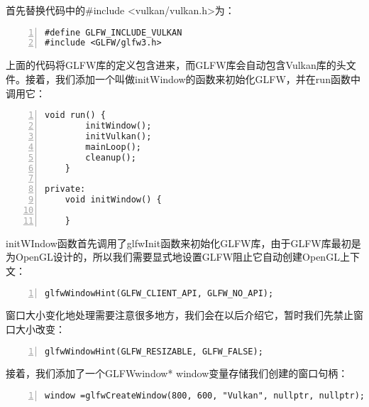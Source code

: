 \documentclass{ctexart}
\begin{document}
首先替换代码中的\#include <vulkan/vulkan.h>为：

\begin{lstlisting}[language={[ANSI]C},keywordstyle=\color{blue!70},commentstyle=\color{red!50!green!50!blue!50},frame=shadowbox, rulesepcolor=\color{red!20!green!20!blue!20},basicstyle=\small,numbers=left, numberstyle=\tiny,breaklines=true]
#define GLFW_INCLUDE_VULKAN
#include <GLFW/glfw3.h>
\end{lstlisting}

上面的代码将GLFW库的定义包含进来，而GLFW库会自动包含Vulkan库的头文件。接着，我们添加一个叫做initWindow的函数来初始化GLFW，并在run函数中调用它：

\begin{lstlisting}[language={[ANSI]C},keywordstyle=\color{blue!70},commentstyle=\color{red!50!green!50!blue!50},frame=shadowbox, rulesepcolor=\color{red!20!green!20!blue!20},basicstyle=\small,numbers=left, numberstyle=\tiny,breaklines=true]
	void run() {
		initWindow();
		initVulkan();
		mainLoop();
		cleanup();
	}

private:
	void initWindow() {

	}
\end{lstlisting}

initWIndow函数首先调用了glfwInit函数来初始化GLFW库，由于GLFW库最初是为OpenGL设计的，所以我们需要显式地设置GLFW阻止它自动创建OpenGL上下文：

\begin{lstlisting}[language={[ANSI]C},keywordstyle=\color{blue!70},commentstyle=\color{red!50!green!50!blue!50},frame=shadowbox, rulesepcolor=\color{red!20!green!20!blue!20},basicstyle=\small,numbers=left, numberstyle=\tiny,breaklines=true]
glfwWindowHint(GLFW_CLIENT_API, GLFW_NO_API);
\end{lstlisting}

窗口大小变化地处理需要注意很多地方，我们会在以后介绍它，暂时我们先禁止窗口大小改变：

\begin{lstlisting}[language={[ANSI]C},keywordstyle=\color{blue!70},commentstyle=\color{red!50!green!50!blue!50},frame=shadowbox, rulesepcolor=\color{red!20!green!20!blue!20},basicstyle=\small,numbers=left, numberstyle=\tiny,breaklines=true]
glfwWindowHint(GLFW_RESIZABLE, GLFW_FALSE);
\end{lstlisting}

接着，我们添加了一个GLFWwindow* window变量存储我们创建的窗口句柄：

\begin{lstlisting}[language={[ANSI]C},keywordstyle=\color{blue!70},commentstyle=\color{red!50!green!50!blue!50},frame=shadowbox, rulesepcolor=\color{red!20!green!20!blue!20},basicstyle=\small,numbers=left, numberstyle=\tiny,breaklines=true]
window =glfwCreateWindow(800, 600, "Vulkan", nullptr, nullptr);
\end{lstlisting}
\end{document}
